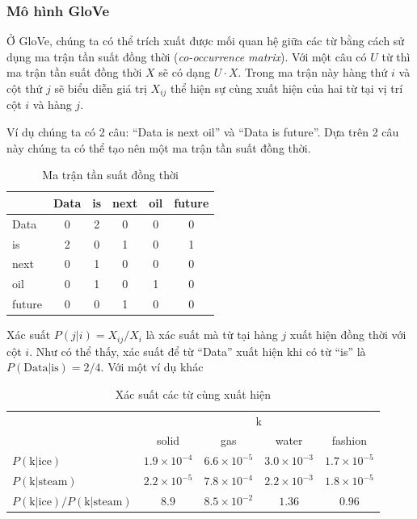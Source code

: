 \subsubsection{Mô hình GloVe}
Ở GloVe, chúng ta có thể trích xuất được mối quan hệ giữa các từ bằng cách sử dụng ma trận tần suất đồng thời (\textit{co-occurrence matrix}). Với một câu có $U$ từ thì ma trận tần suất đồng thời $X$ sẽ có dạng $U\cdot X$. Trong ma trận này hàng thứ $i$ và cột thứ $j$ sẽ biểu diễn giá trị $X_{ij}$ thể hiện sự cùng xuất hiện của hai từ tại vị trí cột $i$ và hàng $j$.

Ví dụ chúng ta có 2 câu: ``Data is next oil'' và ``Data is future''. Dựa trên 2 câu này chúng ta có thể tạo nên một ma trận tần suất đồng thời.
\begin{table}[htb]
    \centering
    \caption{Ma trận tần suất đồng thời \cite{webpage9}}
    \label{table:frequency-matrix}
    \begin{tabular}{ l c c c c c }
        \toprule
               & Data & is & next & oil & future \\\midrule
        Data   & 0    & 2  & 0    & 0   & 0      \\
        is     & 2    & 0  & 1    & 0   & 1      \\
        next   & 0    & 1  & 0    & 0   & 0      \\
        oil    & 0    & 1  & 0    & 1   & 0      \\
        future & 0    & 0  & 1    & 0   & 0      \\
        \bottomrule
    \end{tabular}
\end{table}

Xác suất $P(j|i) = X_{ij}/X_i$ là xác suất mà từ tại hàng $j$ xuất hiện đồng thời với cột $i$. Như có thể thấy, xác suất để từ ``Data'' xuất hiện khi có từ ``is'' là $P(\text{Data|is}) = 2/4$. Với một ví dụ khác
\begin{table}[htb]
    \centering
    \caption{Xác suất các từ cùng xuất hiện \cite{webpage9}}
    \begin{tabular}{ l c c c c }
        \toprule
                                            & \multicolumn{4}{c}{k}                                                                   \\\cmidrule{2-5}
                                            & solid                 & gas                 & water               & fashion             \\\midrule
        $P(\text{k|ice})$                   & $1.9\times 10^{-4}$   & $6.6\times 10^{-5}$ & $3.0\times 10^{-3}$ & $1.7\times 10^{-5}$ \\
        $P(\text{k|steam})$                 & $2.2\times 10^{-5}$   & $7.8\times 10^{-4}$ & $2.2\times 10^{-3}$ & $1.8\times 10^{-5}$ \\
        $P(\text{k|ice})/P(\text{k|steam})$ & $8.9$                 & $8.5\times 10^{-2}$ & $1.36$              & $0.96$              \\
        \bottomrule
    \end{tabular}
\end{table}

